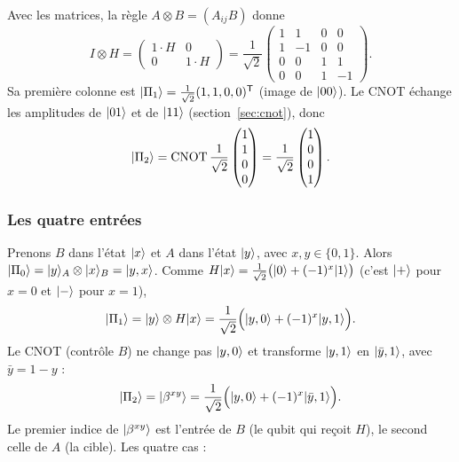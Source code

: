 Avec les matrices, la règle $A\otimes B=(A_{ij}B)$ donne
\[
  I\otimes H=\begin{pmatrix}1\cdot H&0\\0&1\cdot H\end{pmatrix}
  =\frac{1}{\sqrt2}\begin{pmatrix}1&1&0&0\\1&-1&0&0\\0&0&1&1\\0&0&1&-1\end{pmatrix}.
\]
Sa première colonne est $|\Pi_1\rangle=\frac{1}{\sqrt2}(1,1,0,0)^{\mathsf T}$ (image de $|00\rangle$).
Le CNOT échange les amplitudes de $|01\rangle$ et de $|11\rangle$ (section~\ref{sec:cnot}), donc
\[
  |\Pi_2\rangle=\mathrm{CNOT}\,\frac{1}{\sqrt2}\begin{pmatrix}1\\1\\0\\0\end{pmatrix}
  =\frac{1}{\sqrt2}\begin{pmatrix}1\\0\\0\\1\end{pmatrix}.
\]

\subsubsection{Les quatre entrées}

Prenons $B$ dans l'état $|x\rangle$ et $A$ dans l'état $|y\rangle$, avec $x,y\in\{0,1\}$. Alors
$|\Pi_0\rangle=|y\rangle_A\otimes|x\rangle_B=|y,x\rangle$. Comme
$H|x\rangle=\frac{1}{\sqrt2}\big(|0\rangle+(-1)^x|1\rangle\big)$ (c'est $|+\rangle$ pour $x=0$ et
$|-\rangle$ pour $x=1$),
\[
  |\Pi_1\rangle=|y\rangle\otimes H|x\rangle=\frac{1}{\sqrt2}\Big(|y,0\rangle+(-1)^x|y,1\rangle\Big).
\]
Le CNOT (contrôle $B$) ne change pas $|y,0\rangle$ et transforme $|y,1\rangle$ en
$|\bar y,1\rangle$, avec $\bar y=1-y$ :
\[
  |\Pi_2\rangle=|\beta^{xy}\rangle=\frac{1}{\sqrt2}\Big(|y,0\rangle+(-1)^x|\bar y,1\rangle\Big).
\]
Le premier indice de $|\beta^{xy}\rangle$ est l'entrée de $B$ (le qubit qui reçoit $H$), le
second celle de $A$ (la cible). Les quatre cas :

